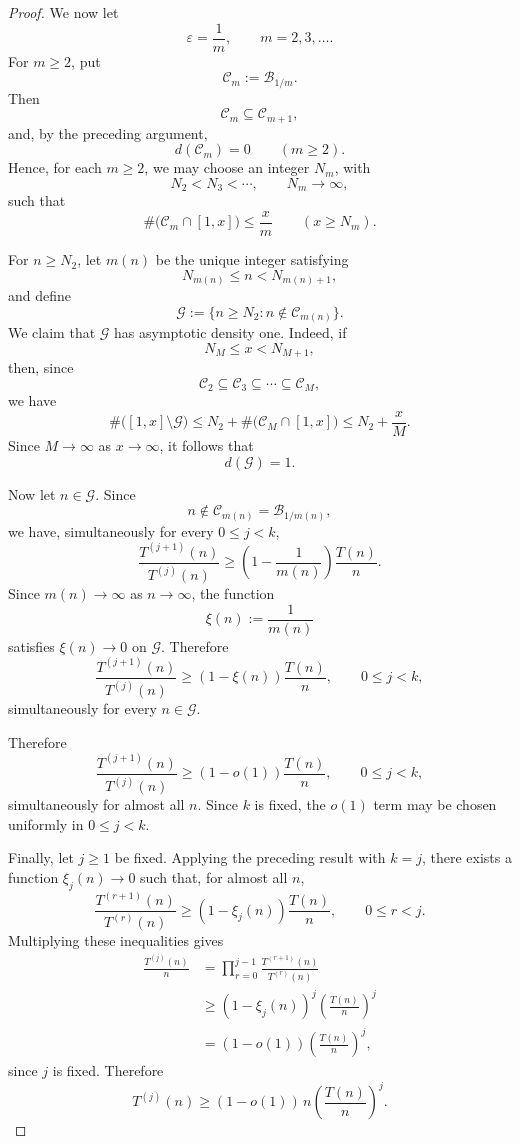 \documentclass{article}
\begin{document}
\begin{proof}
We now let
\[
\varepsilon=\frac1m,\qquad m=2,3,\ldots.
\]
For $m\ge2$, put
\[
\mathcal C_m:=\mathcal B_{1/m}.
\]
Then
\[
\mathcal C_m\subseteq\mathcal C_{m+1},
\]
and, by the preceding argument,
\[
d(\mathcal C_m)=0
\qquad(m\ge2).
\]
Hence, for each $m\ge2$, we may choose an integer $N_m$,
with
\[
N_2<N_3<\cdots,\qquad N_m\to\infty,
\]
such that
\[
\#\bigl(\mathcal C_m\cap[1,x]\bigr)
\le \frac{x}{m}
\qquad(x\ge N_m).
\]

For $n\ge N_2$, let $m(n)$ be the unique integer satisfying
\[
N_{m(n)}\le n<N_{m(n)+1},
\]
and define
\[
\mathcal G
:=
\{n\ge N_2:n\notin\mathcal C_{m(n)}\}.
\]
We claim that $\mathcal G$ has asymptotic density one.
Indeed, if
\[
N_M\le x<N_{M+1},
\]
then, since
\[
\mathcal C_2\subseteq\mathcal C_3\subseteq\cdots\subseteq\mathcal C_M,
\]
we have
\[
\#\bigl([1,x]\setminus\mathcal G\bigr)
\le
N_2+\#\bigl(\mathcal C_M\cap[1,x]\bigr)
\le
N_2+\frac{x}{M}.
\]
Since $M\to\infty$ as $x\to\infty$, it follows that
\[
d(\mathcal G)=1.
\]

Now let $n\in\mathcal G$. Since
\[
n\notin\mathcal C_{m(n)}
=\mathcal B_{1/m(n)},
\]
we have, simultaneously for every $0\le j<k$,
\[
\frac{T^{(j+1)}(n)}{T^{(j)}(n)}
\ge
\left(1-\frac1{m(n)}\right)\frac{T(n)}n.
\]
Since $m(n)\to\infty$ as $n\to\infty$, the function
\[
\xi(n):=\frac1{m(n)}
\]
satisfies $\xi(n)\to0$ on $\mathcal G$. Therefore
\[
\frac{T^{(j+1)}(n)}{T^{(j)}(n)}
\ge
(1-\xi(n))\frac{T(n)}n,
\qquad 0\le j<k,
\]
simultaneously for every $n\in\mathcal G$.

Therefore
\[
\frac{T^{(j+1)}(n)}{T^{(j)}(n)}
\ge
(1-o(1))\frac{T(n)}n,
\qquad
0\le j<k,
\]
simultaneously for almost all $n$. Since $k$ is fixed, the $o(1)$
term may be chosen uniformly in $0\le j<k$.

Finally, let $j\ge1$ be fixed. Applying the preceding result with
$k=j$, there exists a function $\xi_j(n)\to0$ such that, for almost
all $n$,
\[
\frac{T^{(r+1)}(n)}{T^{(r)}(n)}
\ge
(1-\xi_j(n))\frac{T(n)}n,
\qquad
0\le r<j.
\]
Multiplying these inequalities gives
\[
\begin{aligned}
\frac{T^{(j)}(n)}n
&=
\prod_{r=0}^{j-1}
\frac{T^{(r+1)}(n)}{T^{(r)}(n)}\\
&\ge
(1-\xi_j(n))^j
\left(\frac{T(n)}n\right)^j\\
&=
(1-o(1))
\left(\frac{T(n)}n\right)^j,
\end{aligned}
\]
since $j$ is fixed. Therefore
\[
T^{(j)}(n)
\ge
(1-o(1))\,n
\left(\frac{T(n)}n\right)^j.
\]
\end{proof}
\end{document}
